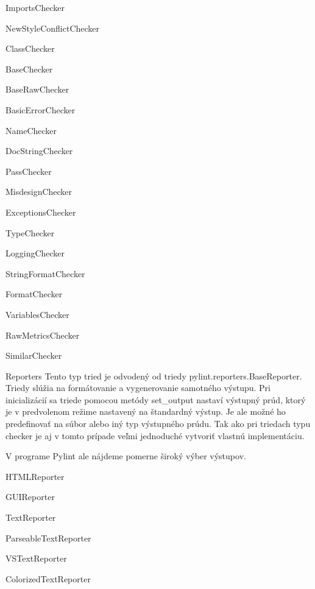 \documentclass[11pt,oneside,final]{fithesis2}
\begin{document}
\begin{list}{•}{}
			    \begin{list}{•}{}
					\item ImportsChecker
					\item NewStyleConflictChecker
					\item ClassChecker
					\item BaseChecker
					\item BaseRawChecker
					\item BasicErrorChecker
					\item NameChecker
					\item DocStringChecker
					\item PassChecker
					\item MisdesignChecker
					\item ExceptionsChecker
					\item TypeChecker
					\item LoggingChecker
					\item StringFormatChecker
					\item FormatChecker
					\item VariablesChecker
					\item RawMetricsChecker
					\item SimilarChecker
    			\end{list}
		

		
		\item Reporters
		Tento typ tried je odvodený od triedy pylint.reporters.BaseReporter. Triedy slúžia na formátovanie a vygenerovanie samotného výstupu. Pri inicializácií sa triede pomocou metódy set\_output nastaví výstupný prúd, ktorý je v predvolenom režime nastavený na štandardný výstup. Je ale možné ho predefinovať na súbor alebo iný typ výstupného prúdu. Tak ako pri triedach typu checker je aj v tomto prípade veľmi jednoduché vytvoriť vlastnú implementáciu.
		
		V programe Pylint ale nájdeme pomerne široký výber výstupov.
		
			    \begin{list}{•}{}
					\item HTMLReporter
					\item GUIReporter
					\item TextReporter
					\item ParseableTextReporter
					\item VSTextReporter
					\item ColorizedTextReporter
    			\end{list}
		
    \end{list}
		
\end{document}
